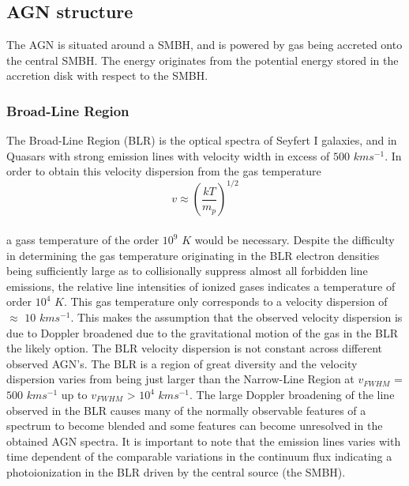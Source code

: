 \documentclass[11pt]{article}
\begin{document}
\subsection{AGN structure}
The AGN is situated around a SMBH, and is powered by gas being accreted onto the central SMBH. The energy originates from the potential energy stored in the accretion disk with respect to the SMBH. 

\subsubsection{Broad-Line Region}
The Broad-Line Region (BLR) is the optical spectra of Seyfert I galaxies, and in Quasars with strong emission lines with velocity width in excess of $500$ $kms^{-1}$. In order to obtain this velocity dispersion from the gas temperature
\begin{equation}
v \approx (\frac{kT} {m_{p}})^{1/2}
\label{eq:v_gas_T}
\end{equation}\\
a gass temperature of the order $10^9$ $K$ would be necessary. Despite the difficulty in determining the gas temperature originating in the BLR electron densities being sufficiently large as to collisionally suppress almost all forbidden line emissions, the relative line intensities of ionized gases indicates a temperature of order $10^4$ $K$. This gas temperature only corresponds to a velocity dispersion of $\approx$ $10$ $kms^{-1}$.
This makes the assumption that the observed velocity dispersion is due to Doppler broadened due to the gravitational motion of the gas in the BLR the likely option. The BLR velocity dispersion is not constant across different observed AGN's. The BLR is a region of great diversity and the velocity dispersion varies from being just larger than the Narrow-Line Region at $v_{FWHM}$ = $500$ $kms^{-1}$ up to $v_{FWHM}$ > $10^{4}$ $kms^{-1}$. %
The large Doppler broadening of the line observed in the BLR causes many of the normally observable features of a spectrum to become blended and some features can become unresolved in the obtained AGN spectra. It is important to note that the emission lines varies with time dependent of the comparable variations in the continuum flux indicating a photoionization in the BLR driven by the central source (the SMBH). \\
\end{document}
